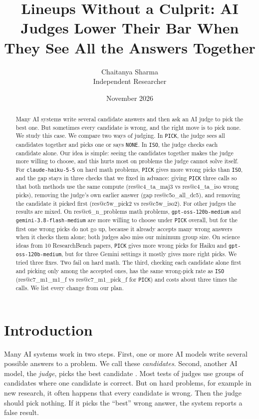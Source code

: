 \documentclass[10pt,twocolumn]{article}
\title{Lineups Without a Culprit: AI Judges Lower Their Bar When They See All the Answers Together}
\author{Chaitanya Sharma\\Independent Researcher}
\date{November 2026}
\makeatletter
\newcommand{\res}[1]{\csname res@#1\endcsname}
\makeatother
\begin{document}
\sloppy
\maketitle

\begin{abstract}
Many AI systems write several candidate answers and then ask an AI judge to pick the best one. But sometimes every candidate is wrong, and the right move is to pick none. We study this case. We compare two ways of judging. In \texttt{PICK}, the judge sees all candidates together and picks one or says \texttt{NONE}. In \texttt{ISO}, the judge checks each candidate alone. Our idea is simple: seeing the candidates together makes the judge more willing to choose, and this hurts most on problems the judge cannot solve itself. For \texttt{claude-haiku-5-5} on hard math problems, \texttt{PICK} gives more wrong picks than \texttt{ISO}, and the gap stays in three checks that we fixed in advance: giving \texttt{PICK} three calls so that both methods use the same compute (\res{c4_ta_maj3} vs \res{c4_ta_iso} wrong picks), removing the judge's own earlier answer (gap \res{c5o_all_dc5}), and removing the candidate it picked first (\res{c5w_pick2} vs \res{c5w_iso2}). For other judges the results are mixed. On \res{c6_n_problems} math problems, \texttt{gpt-oss-120b-medium} and \texttt{gemini-3.8-flash-medium} are more willing to choose under \texttt{PICK} overall, but for the first one wrong picks do not go up, because it already accepts many wrong answers when it checks them alone; both judges also miss our minimum group size. On science ideas from 10 ResearchBench papers, \texttt{PICK} gives more wrong picks for Haiku and \texttt{gpt-oss-120b-medium}, but for three Gemini settings it mostly gives more right picks. We tried three fixes. Two fail on hard math. The third, checking each candidate alone first and picking only among the accepted ones, has the same wrong-pick rate as \texttt{ISO} (\res{c7_m1_m1_f} vs \res{c7_m1_pick_f} for \texttt{PICK}) and costs about three times the calls. We list every change from our plan.
\end{abstract}

\section{Introduction}
Many AI systems work in two steps. First, one or more AI models write several possible answers to a problem. We call these \emph{candidates}. Second, another AI model, the \emph{judge}, picks the best candidate \citep{cobbe2021training,brown2024large,gottweis2025towards,zheng2023judging}. Most tests of judges use groups of candidates where one candidate is correct. But on hard problems, for example in new research, it often happens that every candidate is wrong. Then the judge should pick nothing. If it picks the ``best'' wrong answer, the system reports a false result.
\end{document}

